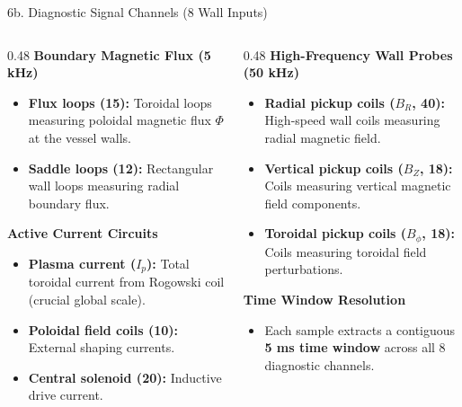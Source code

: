 \documentclass[aspectratio=169, 10pt]{beamer}
\begin{document}
\begin{frame}{6b. Diagnostic Signal Channels (8 Wall Inputs)}
  \begin{columns}[T]
    \begin{column}{0.48\textwidth}
      \textbf{\color{NavyBlue} Boundary Magnetic Flux (5 kHz)}
      \begin{itemize}
        \item \textbf{Flux loops (15):} Toroidal loops measuring poloidal magnetic flux $\Phi$ at the vessel walls.
        \item \textbf{Saddle loops (12):} Rectangular wall loops measuring radial boundary flux.
      \end{itemize}
      \vspace{4pt}
      \textbf{\color{NavyBlue} Active Current Circuits}
      \begin{itemize}
        \item \textbf{Plasma current ($I_p$):} Total toroidal current from Rogowski coil (crucial global scale).
        \item \textbf{Poloidal field coils (10):} External shaping currents.
        \item \textbf{Central solenoid (20):} Inductive drive current.
      \end{itemize}
    \end{column}

    \begin{column}{0.48\textwidth}
      \textbf{\color{NavyBlue} High-Frequency Wall Probes (50 kHz)}
      \begin{itemize}
        \item \textbf{Radial pickup coils ($B_R$, 40):} High-speed wall coils measuring radial magnetic field.
        \item \textbf{Vertical pickup coils ($B_Z$, 18):} Coils measuring vertical magnetic field components.
        \item \textbf{Toroidal pickup coils ($B_\phi$, 18):} Coils measuring toroidal field perturbations.
      \end{itemize}
      \vspace{4pt}
      \textbf{\color{NavyBlue} Time Window Resolution}
      \begin{itemize}
        \item Each sample extracts a contiguous \textbf{5 ms time window} across all 8 diagnostic channels.
      \end{itemize}
    \end{column}
  \end{columns}
\end{frame}
\end{document}
